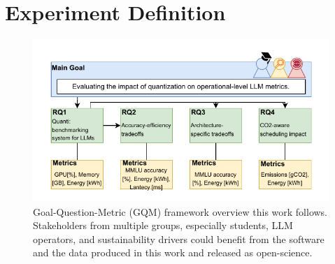\newpage
\section{Experiment Definition}

\begin{figure}[t]
    \centering
    \includegraphics[width=1.05\linewidth]{reportTemplate/figures/gqm.pdf}
    \caption{Goal-Question-Metric (GQM) framework overview this work follows. Stakeholders from multiple groups, especially students, LLM operators, and sustainability drivers could benefit from the software and the data produced in this work and released as open-science.}
    \label{fig:gqm-figure}
\end{figure}

